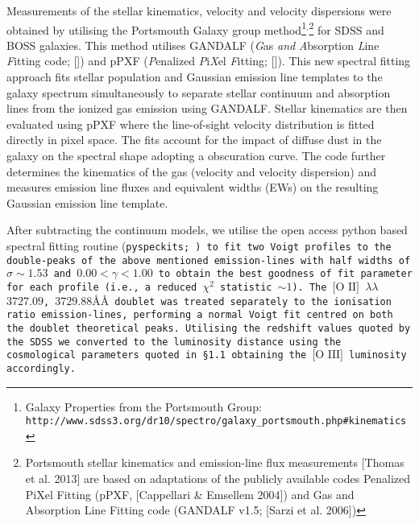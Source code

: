 Measurements of the stellar kinematics, velocity and velocity dispersions were obtained by utilising the Portsmouth Galaxy group method\footnote{\tiny{Galaxy Properties from the Portsmouth Group: \tt{http://www.sdss3.org/dr10/spectro/galaxy_portsmouth.php#kinematics}}}$^{\text{,}}$\footnote{\tiny{Portsmouth stellar kinematics and emission-line flux measurements [Thomas et al. 2013] are based on adaptations of the publicly available codes Penalized PiXel Fitting (pPXF, [Cappellari \& Emsellem 2004]) and Gas and Absorption Line Fitting code (GANDALF v1.5; [Sarzi et al. 2006])}} for SDSS and BOSS galaxies. This method utilises GANDALF (\textit{G}as \textit{and} \textit{A}bsorption \textit{L}ine \textit{F}itting code; [\cite{Sarzi_2006}]) and pPXF (\textit{P}enalized \textit{P}i\textit{X}el \textit{F}itting; [\cite{2012ascl.soft10002C}]). This new spectral fitting approach fits stellar population and Gaussian emission line templates to the galaxy spectrum simultaneously to separate stellar continuum and absorption lines from the ionized gas emission using GANDALF. Stellar kinematics are then evaluated using pPXF where the line-of-sight velocity distribution is fitted directly in pixel space. The fits account for the impact of diffuse dust in the galaxy on the spectral shape adopting a \cite{Calzetti_2001} obscuration curve. The code further determines the kinematics of the gas (velocity and velocity dispersion) and measures emission line fluxes and equivalent widths (EWs) on the resulting Gaussian emission line template.

After subtracting the continuum models, we utilise the open access python based spectral fitting routine (\tt{pyspeckits}; \cite{2011ascl.soft09001G}) to fit two Voigt profiles to the double-peaks of the above mentioned emission-lines with half widths of $\sigma\sim{1.53}$ and ${0.00}<{\gamma}<{1.00}$ to obtain the best goodness of fit parameter for each profile (i.e., a reduced $\chi^{2}$ statistic $\sim{1}$). The $\text{[O II]}$ $\lambda\lambda$$3727.09$, $3729.88ÅÅ$ doublet was treated separately to the ionisation ratio emission-lines, performing a normal Voigt fit centred on both the doublet theoretical peaks. Utilising the redshift values quoted by the SDSS we converted to the luminosity distance using the cosmological parameters quoted in §1.1 obtaining the $\text{[O III]}$ luminosity accordingly.
  
  
  